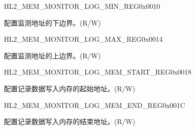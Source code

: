 \begin{register}{H}{L2\_MEM\_MONITOR\_LOG\_MIN\_REG}{0x0010}\label{regdesc:L2MEMMONITORLOGMINREG}
%
\regnewline%
\begin{regdesc}\begin{reglist}
\label{fielddesc:L2MEMMONITORLOGMIN}\item [L2\_MEM\_MONITOR\_LOG\_MIN] 配置监测地址的下边界。(R/W)
\end{reglist}\end{regdesc}
\end{register}


\begin{register}{H}{L2\_MEM\_MONITOR\_LOG\_MAX\_REG}{0x0014}\label{regdesc:L2MEMMONITORLOGMAXREG}
%
\regnewline%
\begin{regdesc}\begin{reglist}
\label{fielddesc:L2MEMMONITORLOGMAX}\item [L2\_MEM\_MONITOR\_LOG\_MAX] 配置监测地址的上边界。(R/W)
\end{reglist}\end{regdesc}
\end{register}


\begin{register}{H}{L2\_MEM\_MONITOR\_LOG\_MEM\_START\_REG}{0x0018}\label{regdesc:L2MEMMONITORLOGMEMSTARTREG}
%
\regnewline%
\begin{regdesc}\begin{reglist}
\label{fielddesc:L2MEMMONITORLOGMEMSTART}\item [L2\_MEM\_MONITOR\_LOG\_MEM\_START] 配置记录数据写入内存的起始地址。(R/W)
\end{reglist}\end{regdesc}
\end{register}


\begin{register}{H}{L2\_MEM\_MONITOR\_LOG\_MEM\_END\_REG}{0x001C}\label{regdesc:L2MEMMONITORLOGMEMENDREG}
%
\regnewline%
\begin{regdesc}\begin{reglist}
\label{fielddesc:L2MEMMONITORLOGMEMEND}\item [L2\_MEM\_MONITOR\_LOG\_MEM\_END] 配置记录数据写入内存的结束地址。(R/W)
\end{reglist}\end{regdesc}
\end{register}



